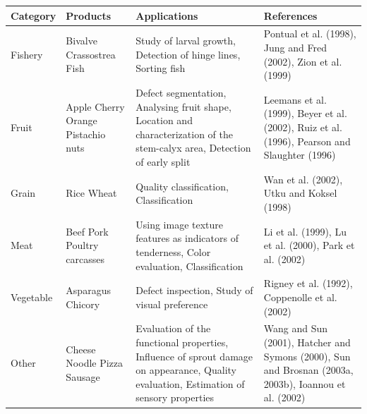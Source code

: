 \documentclass{article}
\begin{document}
{\begin{table}[h]
{\begin{tabular}{|p{2cm}|p{4cm}|p{5cm}|p{4cm}|}
                    \centering \textbf{Category} &\centering \textbf{Products} &\centering \textbf{Applications} & \textbf{\hspace{24pt} References} \\ \hline
                    \centering \vspace{0.2cm}Fishery & \centering \vspace{0.2cm} Bivalve Crassostrea Fish &Study of larval growth, Detection of hinge lines, Sorting fish & Pontual et al. (1998), Jung and Fred (2002), Zion et al. (1999) \\ \hline
                     \centering \vspace*{1\baselineskip}Fruit & \centering \vspace*{1\baselineskip} Apple Cherry Orange Pistachio nuts & Defect segmentation, Analysing fruit shape, Location and characterization of the stem-calyx area, Detection of early split & Leemans et al. (1999), Beyer et al. (2002), Ruiz et al. (1996), Pearson and Slaughter (1996) \\ \hline
                     \centering \vspace{0.1cm}Grain & \centering \vspace{0.1cm}Rice Wheat & Quality classification, Classification & Wan et al. (2002), Utku and Koksel (1998) \\ \hline
                     \centering \vspace*{1\baselineskip}Meat & \centering \vspace*{1\baselineskip} Beef Pork Poultry carcasses & Using image texture features as indicators of tenderness, Color evaluation, Classification & Li et al. (1999), Lu et al. (2000), Park et al. (2002) \\ \hline
                     \centering \vspace*{0.1cm}Vegetable & \centering \vspace*{0.1cm} Asparagus Chicory & Defect inspection, Study of visual preference & Rigney et al. (1992), Coppenolle et al. (2002) \\ \hline
                     \centering \vspace*{2\baselineskip}Other & \centering \vspace*{1\baselineskip} Cheese Noodle Pizza Sausage & Evaluation of the functional properties, Influence of sprout damage on appearance, Quality evaluation, Estimation of sensory properties & Wang and Sun (2001), Hatcher and Symons (2000), Sun and Brosnan (2003a, 2003b), Ioannou et al. (2002) \\ \hline
                \end{tabular}}
                \end{table}
                
}
\end{document}
